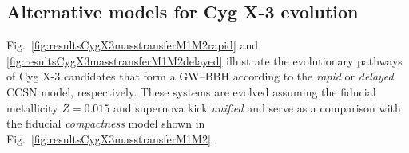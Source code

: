 \documentclass[a4paper,titlepage]{book}     	%
\begin{document}
\begin{appendices}




\chapter{Alternative models for Cyg X-3 evolution}\label{appsec:CYgX3GWBBHs}
Fig.\ \ref{fig:resultsCygX3masstransferM1M2rapid} and \ref{fig:resultsCygX3masstransferM1M2delayed} illustrate the evolutionary pathways of Cyg X-3 candidates that form a GW--BBH according to the \emph{rapid} or \emph{delayed} CCSN model, respectively. These systems are evolved assuming the fiducial metallicity $Z=0.015$ and supernova kick \emph{unified} and serve as a comparison with the fiducial \emph{compactness} model shown in Fig.\ \ref{fig:resultsCygX3masstransferM1M2}.


\end{appendices}
\end{document}
